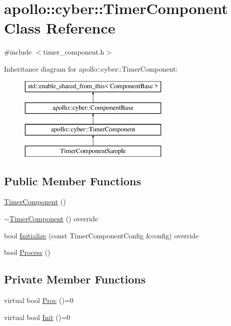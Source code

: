 \hypertarget{classapollo_1_1cyber_1_1TimerComponent}{\section{apollo\-:\-:cyber\-:\-:Timer\-Component Class Reference}
\label{classapollo_1_1cyber_1_1TimerComponent}
}


{\ttfamily \#include $<$timer\-\_\-component.\-h$>$}

Inheritance diagram for apollo\-:\-:cyber\-:\-:Timer\-Component\-:\begin{figure}[H]
\begin{center}
\leavevmode
\includegraphics[height=4.000000cm]{classapollo_1_1cyber_1_1TimerComponent}
\end{center}
\end{figure}
\subsection*{Public Member Functions}
\begin{DoxyCompactItemize}
\item 
\hyperlink{classapollo_1_1cyber_1_1TimerComponent_aebf4006bbb8db450f6809325240930b9}{Timer\-Component} ()
\item 
\hyperlink{classapollo_1_1cyber_1_1TimerComponent_a4d7f782e4f8b6eab7a0bb991aa31573f}{$\sim$\-Timer\-Component} () override
\item 
bool \hyperlink{classapollo_1_1cyber_1_1TimerComponent_ab3ccbb7662d6b83d1d58d790a6d1713d}{Initialize} (const Timer\-Component\-Config \&config) override
\item 
bool \hyperlink{classapollo_1_1cyber_1_1TimerComponent_aaddc2a38c0986f45d8b9f5e6102f634b}{Process} ()
\end{DoxyCompactItemize}
\subsection*{Private Member Functions}
\begin{DoxyCompactItemize}
\item 
virtual bool \hyperlink{classapollo_1_1cyber_1_1TimerComponent_a461ccefdba276b04fa275a5302c03cbf}{Proc} ()=0
\item 
virtual bool \hyperlink{classapollo_1_1cyber_1_1TimerComponent_a1aca7ad923de44fba59a868988563ad3}{Init} ()=0
\end{DoxyCompactItemize}
